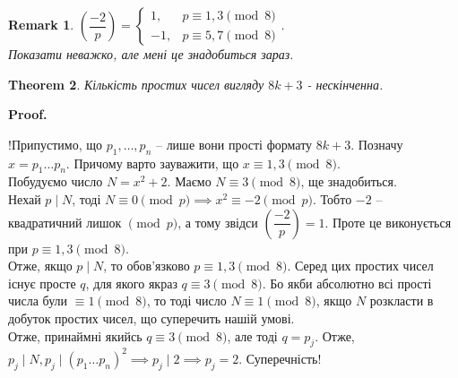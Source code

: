 \documentclass[a4paper, 14pt]{extarticle}
\makeatletter
\theoremstyle{theoremdd}
\newtheorem{theorem}{Theorem}[subsection]
\theoremstyle{theoremdd}
\theoremstyle{theoremdd}
\theoremstyle{theoremdd}
\theoremstyle{theoremdd}
\theoremstyle{theoremdd}
\newtheorem{remark}[theorem]{Remark}
\theoremstyle{theoremdd}
\theoremstyle{theoremdd}
\def\qed{$\blacksquare$}
\renewenvironment{proof}[1][Proof.\\]{\par
\pushQED{\hfill \qed}%
\normalfont \topsep6\p@\@plus6\p@\relax
\trivlist
\item\relax
{\bfseries
#1\@addpunct{.}}\hspace\labelsep\ignorespaces
}{%
\popQED\endtrivlist\@endpefalse
}
\makeatother
\begin{document}
\begin{remark}
$\left( \dfrac{-2}{p} \right) = \begin{cases} 1, & p \equiv 1,3 \pmod 8 \\ -1, & p \equiv 5,7 \pmod 8 \end{cases}$.\\
Показати неважко, але мені це знадобиться зараз.
\end{remark}

\begin{theorem}
Кількість простих чисел вигляду $8k+3$ - нескінченна.
\end{theorem}

\begin{proof}
!Припустимо, що $p_1,\dots,p_n$ -- лише вони прості формату $8k+3$. Позначу $x = p_1\dots p_n$. Причому варто зауважити, що $x \equiv 1,3 \pmod 8$.\\
Побудуємо число $N = x^2+2$. Маємо $N \equiv 3 \pmod 8$, ще знадобиться.\\
Нехай $p \mid N$, тоді $N \equiv 0 \pmod p \implies x^2 \equiv -2 \pmod p$. Тобто $-2$ -- квадратичний лишок $\pmod p$, а тому звідси $\left( \dfrac{-2}{p} \right) = 1$. Проте це виконується при $p \equiv 1,3 \pmod 8$.\\
Отже, якщо $p \mid N$, то обов'язково $p \equiv 1,3 \pmod 8$. Серед цих простих чисел існує просте $q$, для якого якраз $q \equiv 3 \pmod 8$. Бо якби абсолютно всі прості числа були $\equiv 1 \pmod 8$, то тоді число $N \equiv 1 \pmod 8$, якщо $N$ розкласти в добуток простих чисел, що суперечить нашій умові.\\
Отже, принаймні якийсь $q \equiv 3 \pmod 8$, але тоді $q = p_j$. Отже, \\
$p_j \mid N, p_j \mid (p_1\dots p_n)^2 \implies p_j \mid 2 \implies p_j = 2$. Суперечність!
\end{proof}
\end{document}
